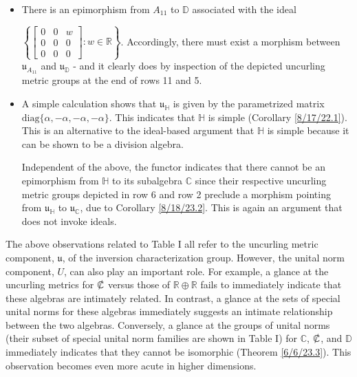 \documentclass{amsart}
\numberwithin{equation}{section}
\theoremstyle{definition}
\numberwithin{theorem}{section}
\begin{document}
\begin{itemize}
 $\left\{\left[\begin{array}{ccc}
0  & 0 & w   \\
 0 & 0 & v \\
 0 & 0 & 0    
\end{array}\right]:w,v\in\mathbb{R}\right\}$.
The functor then implies that there must exist a morphism from $\mathfrak{u}_{A_{12}}$ to $\mathfrak{u}_{\mathbb{D}}$.  Indeed, existence of the latter morphism is obvious from the last entries in rows 12 and 5 of Table I. 
 \item There is an epimorphism from $A_{11}$ to $\mathbb{D}$ associated with the ideal 
 
 $ \left\{\left[\begin{array}{ccc}
0  & 0 & w   \\
 0 & 0 & 0 \\
 0 & 0 & 0    
\end{array}\right]:w\in\mathbb{R} \right\} $. Accordingly, there must exist a morphism between $\mathfrak{u}_{A_{11}}$ and $\mathfrak{u}_{\mathbb{D}}$  - and it clearly does by inspection of the depicted uncurling metric groups at the end of rows 11 and 5.  
 \item A simple calculation shows that $\mathfrak{u}_{\mathbb{H}}$ is given by the parametrized matrix $\text{diag}\{\alpha,-\alpha,-\alpha,-\alpha\}$.  This indicates that  $\mathbb{H}$ is simple (Corollary \ref{8/17/22.1}).  This is an alternative to the ideal-based argument that $\mathbb{H}$ is simple because it can be shown to be a division algebra.

 Independent of the above, the functor indicates that there cannot be an epimorphism from  $\mathbb{H}$ to its subalgebra $\mathbb{C}$ since 	their respective uncurling metric groups depicted in row 6 and row 2 preclude a morphism pointing from $\mathfrak{u}_{\mathbb{H}}$ to $\mathfrak{u}_{\mathbb{C}}$, due to Corollary \ref{8/18/23.2}.  This is again an argument that does not invoke ideals.
 \end{itemize}
 
 The above observations related to Table I all refer to the uncurling metric component, $\mathfrak{u}$, of the inversion characterization group.  However, the unital norm component, $U$, can also play an important role.  For example, a glance at the uncurling metrics for $\slashed{\mathbb{C}}$ versus those of $\mathbb{R}\oplus\mathbb{R}$ fails to immediately indicate that these algebras are intimately related.   In contrast, a glance at the sets of special unital norms for these algebras immediately suggests an intimate relationship between the two algebras. Conversely, a glance at the groups of unital norms (their subset of special unital norm families are shown in Table I) for $\mathbb{C}$, $\slashed{\mathbb{C}}$, and $\mathbb{D}$ immediately indicates that they cannot be isomorphic (Theorem \ref{6/6/23.3}).  This observation becomes even more acute in higher dimensions. 
 
\end{document}
